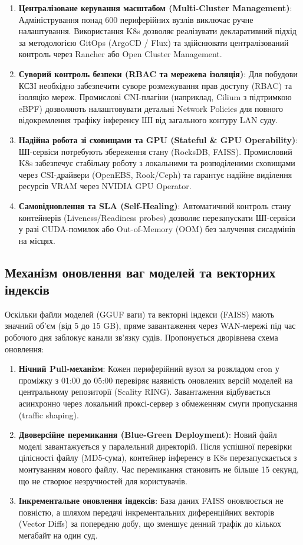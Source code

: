 \documentclass{article}
\begin{document}
\begin{enumerate}
\item \textbf{Централізоване керування масштабом (Multi-Cluster Management)}: Адміністрування понад 600 периферійних вузлів виключає ручне налаштування. Використання K8s дозволяє реалізувати декларативний підхід за методологією GitOps (ArgoCD / Flux) та здійснювати централізований контроль через Rancher або Open Cluster Management.
\item \textbf{Суворий контроль безпеки (RBAC та мережева ізоляція)}: Для побудови КСЗІ необхідно забезпечити суворе розмежування прав доступу (RBAC) та ізоляцію мереж. Промислові CNI-плагіни (наприклад, Cilium з підтримкою eBPF) дозволяють налаштовувати детальні Network Policies для повного відокремлення трафіку інференсу ШІ від загального контуру LAN суду.
\item \textbf{Надійна робота зі сховищами та GPU (Stateful \& GPU Operability)}: ШІ-сервіси потребують збереження стану (RocksDB, FAISS). Промисловий K8s забезпечує стабільну роботу з локальними та розподіленими сховищами через CSI-драйвери (OpenEBS, Rook/Ceph) та гарантує надійне виділення ресурсів VRAM через NVIDIA GPU Operator.
\item \textbf{Самовідновлення та SLA (Self-Healing)}: Автоматичний контроль стану контейнерів (Liveness/Readiness probes) дозволяє перезапускати ШІ-сервіси у разі CUDA-помилок або Out-of-Memory (OOM) без залучення сисадмінів на місцях.
\end{enumerate}

\subsection{Механізм оновлення ваг моделей та векторних індексів}
Оскільки файли моделей (GGUF ваги) та векторні індекси (FAISS) мають значний об'єм (від 5 до 15 GB), пряме завантаження через WAN-мережі під час робочого дня заблокує канали зв'язку судів. Пропонується дворівнева схема оновлення:
\begin{enumerate}
\item \textbf{Нічний Pull-механізм}: Кожен периферійний вузол за розкладом cron у проміжку з 01:00 до 05:00 перевіряє наявність оновлених версій моделей на центральному репозиторії (Scality RING). Завантаження відбувається асинхронно через локальний проксі-сервер з обмеженням смуги пропускання (traffic shaping).
\item \textbf{Двоверсійне перемикання (Blue-Green Deployment)}: Новий файл моделі завантажується у паралельний директорій. Після успішної перевірки цілісності файлу (MD5-сума), контейнер інференсу в K8s перезапускається з монтуванням нового файлу. Час перемикання становить не більше 15 секунд, що не створює незручностей для користувачів.
\item \textbf{Інкрементальне оновлення індексів}: База даних FAISS оновлюється не повністю, а шляхом передачі інкрементальних диференційних векторів (Vector Diffs) за попередню добу, що зменшує денний трафік до кількох мегабайт на один суд.
\end{enumerate}
\end{document}
